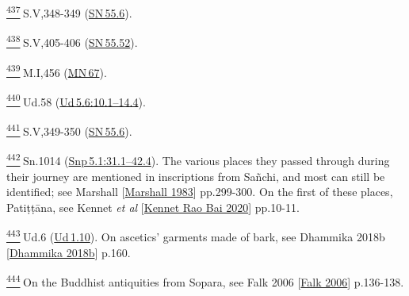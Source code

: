 \label{footprints_split_025.html_fn437}
\hyperref[footprints_split_012.htmlux5cux23fnref437]{\textsuperscript{437}} S.V,348-349
(\href{https://suttacentral.net/sn55.6/en/sujato}{SN\,55.6}).

\label{footprints_split_025.html_fn438}
\hyperref[footprints_split_012.htmlux5cux23fnref438]{\textsuperscript{438}} S.V,405-406
(\href{https://suttacentral.net/sn55.52/en/sujato}{SN\,55.52}).

\label{footprints_split_025.html_fn439}
\hyperref[footprints_split_012.htmlux5cux23fnref439]{\textsuperscript{439}} M.I,456
(\href{https://suttacentral.net/mn67/en/sujato}{MN\,67}).

\label{footprints_split_025.html_fn440}
\hyperref[footprints_split_012.htmlux5cux23fnref440]{\textsuperscript{440}} Ud.58
(\href{https://suttacentral.net/ud5.6/en/sujato\#10.1}{Ud\,5.6:10.1--14.4}).

\label{footprints_split_025.html_fn441}
\hyperref[footprints_split_012.htmlux5cux23fnref441]{\textsuperscript{441}} S.V,349-350
(\href{https://suttacentral.net/sn55.6/en/sujato}{SN\,55.6}).

\label{footprints_split_025.html_fn442}
\hyperref[footprints_split_012.htmlux5cux23fnref442]{\textsuperscript{442}} Sn.1014
(\href{https://suttacentral.net/snp5.1/en/sujato\#31.1}{Snp\,5.1:31.1--42.4}).
The various places they passed through during their journey are
mentioned in inscriptions from Sañchi, and most can still be identified;
see {Marshall
{{[}\hyperref[footprints_split_022.htmlux5cux23Marshallux5cux25201983]{Marshall
1983}{]}}} pp.299-300. On the first of these places, Patiṭṭāna, see
{Kennet \emph{et al}
{{[}\hyperref[footprints_split_022.htmlux5cux23Kennetux5cux2520Raoux5cux2520Baiux5cux25202020]{Kennet
Rao Bai 2020}{]}}} pp.10-11.

\label{footprints_split_025.html_fn443}
\hyperref[footprints_split_012.htmlux5cux23fnref443]{\textsuperscript{443}} Ud.6
(\href{https://suttacentral.net/ud1.10/en/sujato}{Ud\,1.10}). On
ascetics' garments made of bark, see {Dhammika 2018b
{{[}\hyperref[footprints_split_022.htmlux5cux23Dhammikaux5cux25202018b]{Dhammika
2018b}{]}}} p.160.

\label{footprints_split_025.html_fn444}
\hyperref[footprints_split_012.htmlux5cux23fnref444]{\textsuperscript{444}} On
the Buddhist antiquities from Sopara, see {Falk 2006
{{[}\hyperref[footprints_split_022.htmlux5cux23Falkux5cux25202006]{Falk
2006}{]}}} p.136-138.

